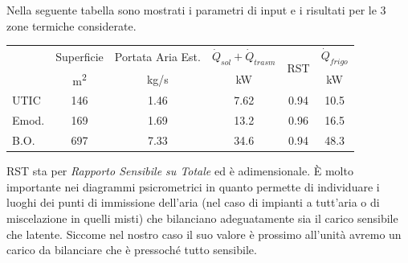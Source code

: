 Nella seguente tabella sono mostrati i parametri di input e i risultati per le 3 zone termiche considerate.
\begin{center}
	\begin{tabular}{lccccc}
		\toprule
					&	Superficie 				&	Portata Aria Est. 			&	$\dot{Q}_{sol}+\dot{Q}_{trasm}$		& 	\multirow{2}{*}{RST}		&	$\dot{Q}_{frigo}$ 	\\
					&	{\small \si{m^2}}		&		{\small \si{kg/s}}		&		{\small \si{kW}}				&								&{\small \si{kW}}		\\					
		\midrule	
		UTIC		&		\num{146}			&		\num{1.46}				&	\num{7.62}		&	0.94					&	\num{10.5}		\\
		Emod.		&		\num{169}			&		\num{1.69}				&	\num{13.2}		&	0.96					&	\num{16.5}		\\
		B.O.		&	\num{697}				&		\num{7.33}				&	\num{34.6}		&	0.94					&	\num{48.3}		\\
		\bottomrule
	\end{tabular}
\end{center}
RST sta per \emph{Rapporto Sensibile su Totale} ed è adimensionale. È molto importante nei diagrammi psicrometrici in quanto permette di individuare i luoghi dei punti di immissione dell'aria (nel caso di impianti a tutt'aria o di miscelazione in quelli misti) che bilanciano adeguatamente sia il carico sensibile che latente. Siccome nel nostro caso il suo valore è prossimo all'unità avremo un carico da bilanciare che è pressoché tutto sensibile.

